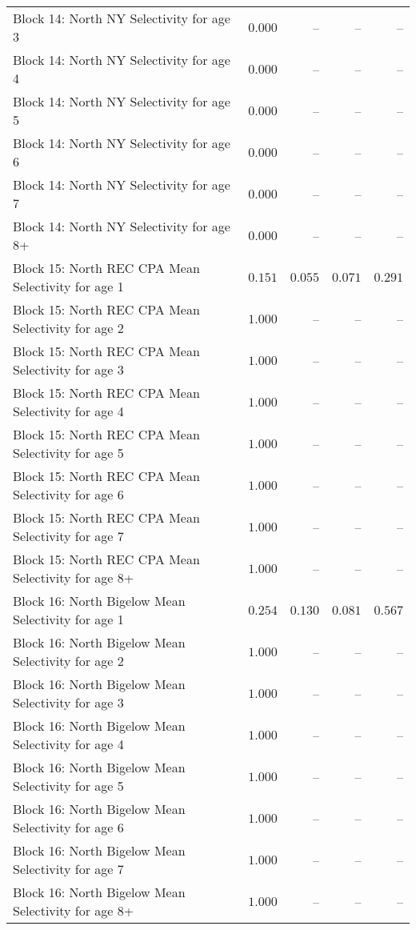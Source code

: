 \documentclass[
]{article}
\begin{document}
\begin{landscape}
\begin{longtable}[t]{lrrrr}
Block 14: North NY Selectivity for age 3 & $0.000$ & -- & -- & --\\
\addlinespace
Block 14: North NY Selectivity for age 4 & $0.000$ & -- & -- & --\\
Block 14: North NY Selectivity for age 5 & $0.000$ & -- & -- & --\\
Block 14: North NY Selectivity for age 6 & $0.000$ & -- & -- & --\\
Block 14: North NY Selectivity for age 7 & $0.000$ & -- & -- & --\\
Block 14: North NY Selectivity for age 8+ & $0.000$ & -- & -- & --\\
\addlinespace
Block 15: North REC CPA Mean Selectivity for age 1 & $0.151$ & $0.055$ & $0.071$ & $0.291$\\
Block 15: North REC CPA Mean Selectivity for age 2 & $1.000$ & -- & -- & --\\
Block 15: North REC CPA Mean Selectivity for age 3 & $1.000$ & -- & -- & --\\
Block 15: North REC CPA Mean Selectivity for age 4 & $1.000$ & -- & -- & --\\
Block 15: North REC CPA Mean Selectivity for age 5 & $1.000$ & -- & -- & --\\
\addlinespace
Block 15: North REC CPA Mean Selectivity for age 6 & $1.000$ & -- & -- & --\\
Block 15: North REC CPA Mean Selectivity for age 7 & $1.000$ & -- & -- & --\\
Block 15: North REC CPA Mean Selectivity for age 8+ & $1.000$ & -- & -- & --\\
Block 16: North Bigelow Mean Selectivity for age 1 & $0.254$ & $0.130$ & $0.081$ & $0.567$\\
Block 16: North Bigelow Mean Selectivity for age 2 & $1.000$ & -- & -- & --\\
\addlinespace
Block 16: North Bigelow Mean Selectivity for age 3 & $1.000$ & -- & -- & --\\
Block 16: North Bigelow Mean Selectivity for age 4 & $1.000$ & -- & -- & --\\
Block 16: North Bigelow Mean Selectivity for age 5 & $1.000$ & -- & -- & --\\
Block 16: North Bigelow Mean Selectivity for age 6 & $1.000$ & -- & -- & --\\
Block 16: North Bigelow Mean Selectivity for age 7 & $1.000$ & -- & -- & --\\
\addlinespace
Block 16: North Bigelow Mean Selectivity for age 8+ & $1.000$ & -- & -- & --\\

\end{longtable}
\end{landscape}
\end{document}
